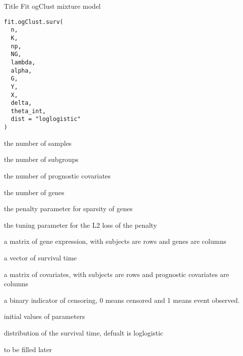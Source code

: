 \documentclass[a4paper]{book}
\begin{document}
%
\begin{Description}\relax
Title Fit ogClust mixture model
\end{Description}
%
\begin{Usage}
\begin{verbatim}
fit.ogClust.surv(
  n,
  K,
  np,
  NG,
  lambda,
  alpha,
  G,
  Y,
  X,
  delta,
  theta_int,
  dist = "loglogistic"
)
\end{verbatim}
\end{Usage}
%
\begin{Arguments}
\begin{ldescription}
\item[\code{n}] the number of samples

\item[\code{K}] the number of subgroups

\item[\code{np}] the number of prognostic covariates

\item[\code{NG}] the number of genes

\item[\code{lambda}] the penalty parameter for sparsity of genes

\item[\code{alpha}] the tuning parameter for the L2 loss of the penalty

\item[\code{G}] a matrix of gene expression, with subjects are rows and genes are columns

\item[\code{Y}] a vector of survival time

\item[\code{X}] a matrix of covariates, with subjects are rows and prognostic covariates are columns

\item[\code{delta}] a binary indicator of censoring, 0 means censored and 1 means event observed.

\item[\code{theta\_int}] initial values of parameters

\item[\code{dist}] distribution of the survival time, defualt is loglogistic
\end{ldescription}
\end{Arguments}
%
\begin{Details}\relax
to be filled later
\end{Details}
\end{document}
